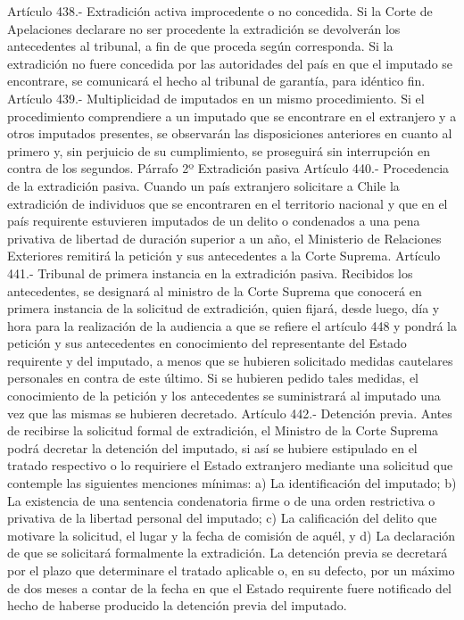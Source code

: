     Artículo 438.- Extradición activa improcedente o no concedida. Si la Corte de Apelaciones declarare no ser procedente la extradición se devolverán los antecedentes al tribunal, a fin de que proceda según corresponda.
    Si la extradición no fuere concedida por las autoridades del país en que el imputado se encontrare, se comunicará el hecho al tribunal de garantía, para idéntico fin.
    Artículo 439.- Multiplicidad de imputados en un mismo procedimiento. Si el procedimiento comprendiere a un imputado que se encontrare en el extranjero y a otros imputados presentes, se observarán las disposiciones anteriores en cuanto al primero y, sin perjuicio de su cumplimiento, se proseguirá sin interrupción en contra de los segundos.
    Párrafo 2º Extradición pasiva
    Artículo 440.- Procedencia de la extradición pasiva. Cuando un país extranjero solicitare a Chile la extradición de individuos que se encontraren en el territorio nacional y que en el país requirente estuvieren imputados de un delito o condenados a una pena privativa de libertad de duración superior a un año, el Ministerio de Relaciones Exteriores remitirá la petición y sus antecedentes a la Corte Suprema.
    Artículo 441.- Tribunal de primera instancia en la extradición pasiva. Recibidos los antecedentes, se designará al ministro de la Corte Suprema que conocerá en primera instancia de la solicitud de extradición, quien fijará, desde luego, día y hora para la realización de la audiencia a que se refiere el artículo 448 y pondrá la petición y sus antecedentes en conocimiento del representante del Estado requirente y del imputado, a menos que se hubieren solicitado medidas cautelares personales en contra de este último. Si se hubieren pedido tales medidas, el conocimiento de la petición y los antecedentes se suministrará al imputado una vez que las mismas se hubieren decretado.
    Artículo 442.- Detención previa. Antes de recibirse la solicitud formal de extradición, el Ministro de la Corte Suprema podrá decretar la detención del imputado, si así se hubiere estipulado en el tratado respectivo o lo requiriere el Estado extranjero mediante una solicitud que contemple las siguientes menciones mínimas:
    a) La identificación del imputado;
    b) La existencia de una sentencia condenatoria firme o de una orden restrictiva o privativa de la libertad personal del imputado;
    c) La calificación del delito que motivare la solicitud, el lugar y la fecha de comisión de aquél, y d) La declaración de que se solicitará formalmente la extradición.
    La detención previa se decretará por el plazo que determinare el tratado aplicable o, en su defecto, por un máximo de dos meses a contar de la fecha en que el Estado requirente fuere notificado del hecho de haberse producido la detención previa del imputado.
